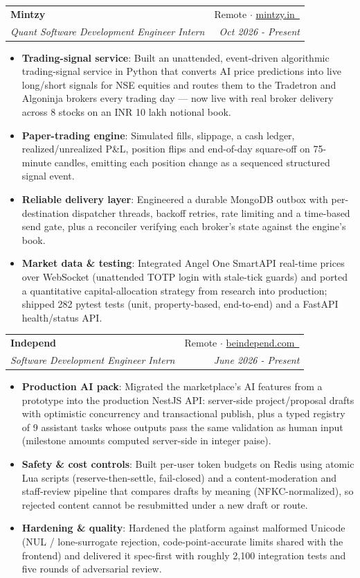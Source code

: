 \documentclass[a4paper,10pt]{article}
\makeatletter
\newcommand{\resumeItem}[2]{
  \item\small{
    \textbf{#1}{: #2 \vspace{-2pt}}
  }
}
\newcommand{\resumeSubheading}[4]{
  \vspace{-1pt}\item
    \begin{tabular*}{0.97\textwidth}{l@{\extracolsep{\fill}}r}
      \textbf{#1} & #2 \\
      \textit{#3} & \textit{#4} \\
    \end{tabular*}\vspace{-5pt}
}
\newcommand{\resumeItemListStart}{\begin{itemize}[topsep=2pt,itemsep=2pt,parsep=0pt,partopsep=0pt]}
\newcommand{\resumeItemListEnd}{\end{itemize}\vspace{-5pt}}
\makeatother
\begin{document}
    \resumeSubheading{Mintzy}{Remote $\cdot$ \href{https://mintzy.in/}{mintzy.in~\footnotesize\faIcon{external-link-alt}}}
    {Quant Software Development Engineer Intern}{Oct 2026 - Present}
    \resumeItemListStart
        \resumeItem{Trading-signal service}
          {Built an unattended, event-driven algorithmic trading-signal service in Python that converts AI price predictions into live long/short signals for NSE equities and routes them to the Tradetron and Algoninja brokers every trading day --- now live with real broker delivery across 8 stocks on an INR 10 lakh notional book.}
        \resumeItem{Paper-trading engine}
          {Simulated fills, slippage, a cash ledger, realized/unrealized P\&L, position flips and end-of-day square-off on 75-minute candles, emitting each position change as a sequenced structured signal event.}
        \resumeItem{Reliable delivery layer}
          {Engineered a durable MongoDB outbox with per-destination dispatcher threads, backoff retries, rate limiting and a time-based send gate, plus a reconciler verifying each broker's state against the engine's book.}
        \vspace{-10pt}
        \resumeItem{Market data \& testing}
          {Integrated Angel One SmartAPI real-time prices over WebSocket (unattended TOTP login with stale-tick guards) and ported a quantitative capital-allocation strategy from research into production; shipped 282 pytest tests (unit, property-based, end-to-end) and a FastAPI health/status API.}
      \resumeItemListEnd

\vspace{3pt}
    \resumeSubheading{Independ}{Remote $\cdot$ \href{https://beindepend.com/}{beindepend.com~\footnotesize\faIcon{external-link-alt}}}
    {Software Development Engineer Intern}{June 2026 - Present}
    \resumeItemListStart
        \resumeItem{Production AI pack}
          {Migrated the marketplace's AI features from a prototype into the production NestJS API: server-side project/proposal drafts with optimistic concurrency and transactional publish, plus a typed registry of 9 assistant tasks whose outputs pass the same validation as human input (milestone amounts computed server-side in integer paise).}
        \resumeItem{Safety \& cost controls}
          {Built per-user token budgets on Redis using atomic Lua scripts (reserve-then-settle, fail-closed) and a content-moderation and staff-review pipeline that compares drafts by meaning (NFKC-normalized), so rejected content cannot be resubmitted under a new draft or route.}
        \resumeItem{Hardening \& quality}
          {Hardened the platform against malformed Unicode (NUL / lone-surrogate rejection, code-point-accurate limits shared with the frontend) and delivered it spec-first with roughly 2,100 integration tests and five rounds of adversarial review.}
      \resumeItemListEnd
\end{document}
